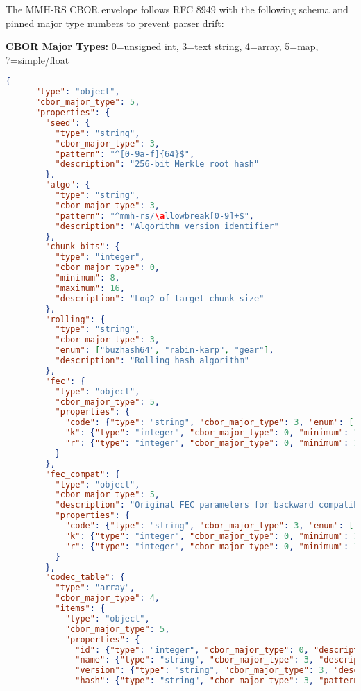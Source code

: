 \documentclass[11pt,a4paper]{article}
\begin{document}
	The MMH-RS CBOR envelope follows RFC 8949 with the following schema and pinned major type numbers to prevent parser drift:
	
	\textbf{CBOR Major Types:} 0=unsigned int, 3=text string, 4=array, 5=map, 7=simple/float
	
	\begin{lstlisting}[language=json, breaklines=true, basicstyle=\ttfamily\footnotesize, columns=fullflexible, keepspaces=true]
	{
	  "type": "object",
	  "cbor_major_type": 5,
	  "properties": {
	    "seed": {
	      "type": "string",
	      "cbor_major_type": 3,
	      "pattern": "^[0-9a-f]{64}$",
	      "description": "256-bit Merkle root hash"
	    },
	    "algo": {
	      "type": "string",
	      "cbor_major_type": 3,
	      "pattern": "^mmh-rs/\allowbreak[0-9]+$",
	      "description": "Algorithm version identifier"
	    },
	    "chunk_bits": {
	      "type": "integer",
	      "cbor_major_type": 0,
	      "minimum": 8,
	      "maximum": 16,
	      "description": "Log2 of target chunk size"
	    },
	    "rolling": {
	      "type": "string",
	      "cbor_major_type": 3,
	      "enum": ["buzhash64", "rabin-karp", "gear"],
	      "description": "Rolling hash algorithm"
	    },
	    "fec": {
	      "type": "object",
	      "cbor_major_type": 5,
	      "properties": {
	        "code": {"type": "string", "cbor_major_type": 3, "enum": ["raptorq"]},
	        "k": {"type": "integer", "cbor_major_type": 0, "minimum": 1, "maximum": 8192},
	        "r": {"type": "integer", "cbor_major_type": 0, "minimum": 1, "maximum": 1000}
	      }
	    },
	    "fec_compat": {
	      "type": "object",
	      "cbor_major_type": 5,
	      "description": "Original FEC parameters for backward compatibility",
	      "properties": {
	        "code": {"type": "string", "cbor_major_type": 3, "enum": ["raptorq"]},
	        "k": {"type": "integer", "cbor_major_type": 0, "minimum": 1, "maximum": 8192},
	        "r": {"type": "integer", "cbor_major_type": 0, "minimum": 1, "maximum": 1000}
	      }
	    },
	    "codec_table": {
	      "type": "array",
	      "cbor_major_type": 4,
	      "items": {
	        "type": "object",
	        "cbor_major_type": 5,
	        "properties": {
	          "id": {"type": "integer", "cbor_major_type": 0, "description": "Unique codec identifier"},
	          "name": {"type": "string", "cbor_major_type": 3, "description": "Human-readable codec name"},
	          "version": {"type": "string", "cbor_major_type": 3, "description": "Codec version for reproducibility"},
	          "hash": {"type": "string", "cbor_major_type": 3, "pattern": "^[0-9a-f]{64}$", "description": "Codec binary hash"},

\end{lstlisting}
\end{document}
